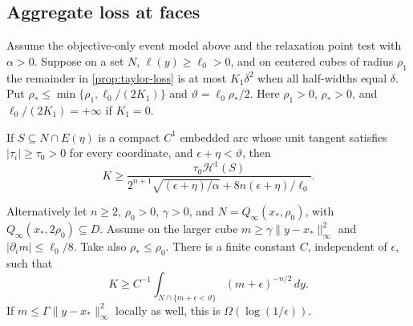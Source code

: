 \subsection{Aggregate loss at faces}
\label{app:propagation-face-loss}

\begin{proposition}
\label{prop:nd1}
Assume the objective-only event model above and the relaxation point test
with $\alpha>0$. Suppose on a set $N$,
$\ell(y)\ge\ell_0>0$, and on centered cubes of radius $\rho_1$ the
remainder in \eqref{prop:taylor-loss} is at most $K_1\delta^2$ when
all half-widths equal $\delta$. Put
$\rho_*\le\min\{\rho_1,\ell_0/(2K_1)\}$ and
$\vartheta=\ell_0\rho_*/2$.
Here $\rho_1>0$, $\rho_*>0$, and $\ell_0/(2K_1)=+\infty$ if $K_1=0$.

If $S\subseteq N\cap E(\eta)$ is a compact $C^1$ embedded arc whose unit
tangent satisfies $|\tau_i|\ge\tau_0>0$ for every coordinate, and
$\epsilon+\eta<\vartheta$, then
\begin{equation}
 K\ge\frac{\tau_0\mathcal H^1(S)}
 {2^{n+1}\sqrt{(\epsilon+\eta)/\alpha}
                 +8n(\epsilon+\eta)/\ell_0}.
 \label{prop:nd1-curve}
\end{equation}

Alternatively let $n\ge2$, $\rho_0>0$, $\gamma>0$, and
$N=Q_\infty(x_*,\rho_0)$, with
$Q_\infty(x_*,2\rho_0)\subseteq D$. Assume on the larger cube
$m\ge\gamma\|y-x_*\|_\infty^2$ and
$|\partial_im|\le\ell_0/8$. Take also $\rho_*\le\rho_0$. There is
a finite constant $C$, independent of $\epsilon$, such that
\begin{equation}
 K\ge C^{-1}\int_{N\cap\{m+\epsilon<\vartheta\}}
             (m+\epsilon)^{-n/2}\,dy.
 \label{prop:nd1-integral}
\end{equation}
If $m\le\Gamma\|y-x_*\|_\infty^2$ locally as well, this is
$\Omega(\log(1/\epsilon))$.
\end{proposition}

